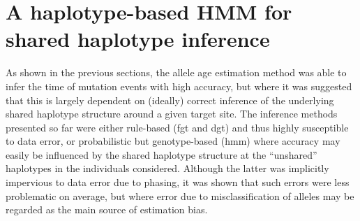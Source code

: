 






%
%
%
%




%
\section{A haplotype-based HMM for shared haplotype inference}
%

As shown in the previous sections, the allele age estimation method was able to infer the time of mutation events with high accuracy, but where it was suggested that this is largely dependent on (ideally) correct inference of the underlying shared haplotype structure around a given target site.
The inference methods presented so far were either rule-based (\gls{fgt} and \gls{dgt}) and thus highly susceptible to data error, or probabilistic but genotype-based (\gls{hmm}) where accuracy may easily be influenced by the shared haplotype structure at the ``unshared'' haplotypes in the individuals considered.
Although the latter was implicitly impervious to data error due to phasing, it was shown that such errors were less problematic on average, but where error due to misclassification of alleles may be regarded as the main source of estimation bias.

